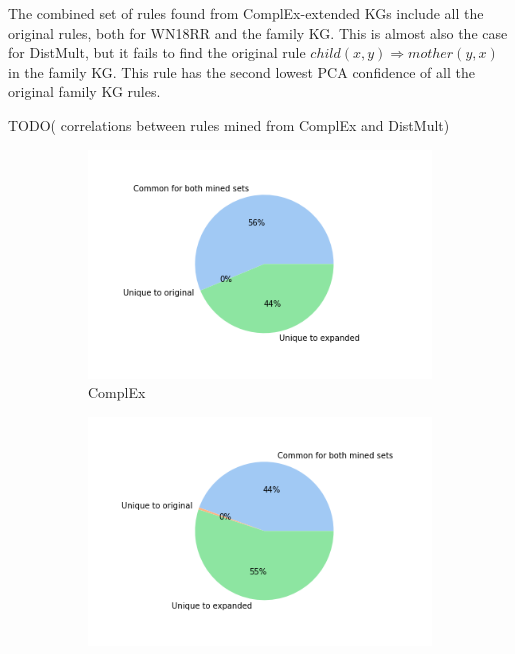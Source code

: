 The combined set of rules found from ComplEx-extended KGs include all the original rules, both for WN18RR and the family KG.  This is almost also the case for DistMult, but it fails to find the original rule $child(x, y) \Rightarrow mother(y,x)$ in the family KG. This rule has the second lowest PCA confidence of all the original family KG rules.


TODO( correlations between rules mined from ComplEx and DistMult)


    \begin{figure}[h]
        \centering
        \begin{subfigure}[b]{0.49\textwidth}
            \centering
            \includegraphics[width=\textwidth]{figures/results/pie_charts-model/complEx_family.png}
            \caption[complEx_pie]%
            {{\small ComplEx}}    
            \label{fig:complex_pie_family}
        \end{subfigure}
        \hfill
        \begin{subfigure}[b]{0.49\textwidth}  
            \centering 
            \includegraphics[width=\textwidth]{figures/results/pie_charts-model/distMult_family.png}

\end{subfigure}
\end{figure}
